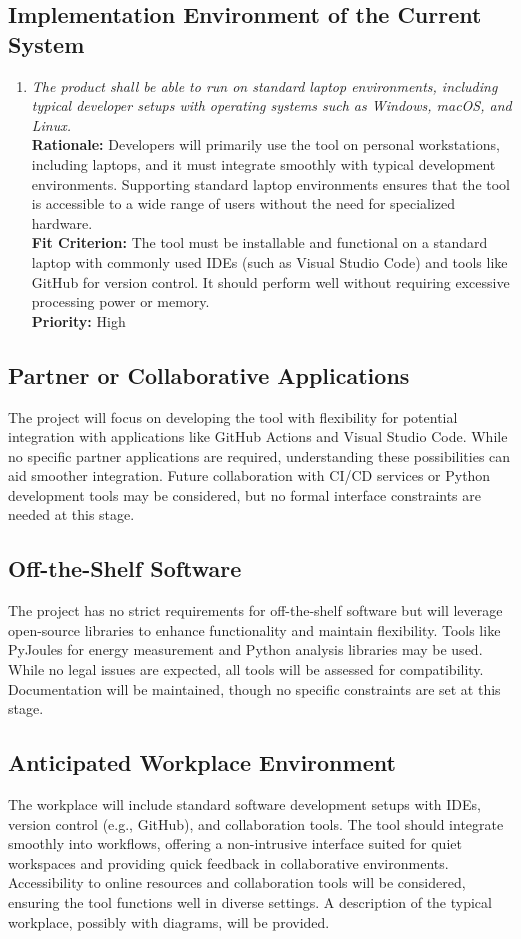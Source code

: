 \documentclass[12pt]{article}
\begin{document}
\subsection{Implementation Environment of the Current System}
\begin{enumerate}[label=MD-EC \arabic*., wide=0pt, leftmargin=*]
    \item \emph{The product shall be able to run on standard laptop environments, including typical developer setups with operating systems such as Windows, macOS, and Linux.}\\[2mm]
    {\bf Rationale:} Developers will primarily use the tool on personal workstations, including laptops, and it must integrate smoothly with typical development environments. Supporting standard laptop environments ensures that the tool is accessible to a wide range of users without the need for specialized hardware.\\
    {\bf Fit Criterion:} The tool must be installable and functional on a standard laptop with commonly used IDEs (such as Visual Studio Code) and tools like GitHub for version control. It should perform well without requiring excessive processing power or memory.\\
    {\bf Priority:} High
\end{enumerate}
\subsection{Partner or Collaborative Applications}
The project will focus on developing the tool with flexibility for potential integration with applications like GitHub Actions and Visual Studio Code. While no specific partner applications are required, understanding these possibilities can aid smoother integration. Future collaboration with CI/CD services or Python development tools may be considered, but no formal interface constraints are needed at this stage.
\subsection{Off-the-Shelf Software}
The project has no strict requirements for off-the-shelf software but will leverage open-source libraries to enhance functionality and maintain flexibility. Tools like PyJoules for energy measurement and Python analysis libraries may be used. While no legal issues are expected, all tools will be assessed for compatibility. Documentation will be maintained, though no specific constraints are set at this stage.
\subsection{Anticipated Workplace Environment}
The workplace will include standard software development setups with IDEs, version control (e.g., GitHub), and collaboration tools. The tool should integrate smoothly into workflows, offering a non-intrusive interface suited for quiet workspaces and providing quick feedback in collaborative environments. Accessibility to online resources and collaboration tools will be considered, ensuring the tool functions well in diverse settings. A description of the typical workplace, possibly with diagrams, will be provided.
\end{document}
